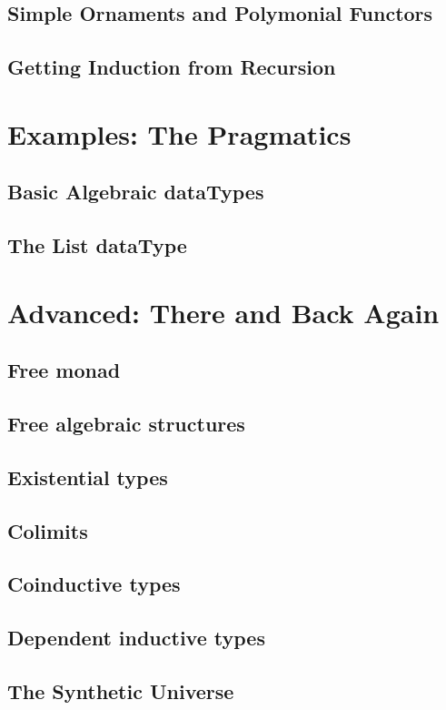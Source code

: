 \documentclass[11pt,oneside]{article}
\begin{document}
\subsection{Simple Ornaments and Polymonial Functors}

\subsection{Getting Induction from Recursion}



\section{Examples: The Pragmatics}
\subsection{Basic Algebraic dataTypes}
\subsection{The List dataType}

\section{Advanced: There and Back Again}
\subsection{Free monad}
\subsection{Free algebraic structures}
\subsection{Existential types}
\subsection{Colimits}
\subsection{Coinductive types}
\subsection{Dependent inductive types}
\subsection{The Synthetic Universe}
\end{document}
